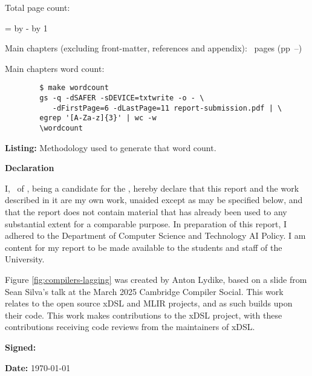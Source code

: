 \begin{sffamily}
Total page count: \pageref{LastPage}

\makeatletter
\@tempcnta=\relax%
\advance\@tempcnta by -%
\advance\@tempcnta by 1%
\xdef\contentpages{\the\@tempcnta}%
\makeatother

Main chapters (excluding front-matter, references and appendix):
\contentpages~pages
(pp~\pageref{firstcontentpage}--\pageref{lastcontentpage})

Main chapters word count: \wordcount

\vspace*{2em}
\begin{code}
    \begin{verbatim}
        $ make wordcount
        gs -q -dSAFER -sDEVICE=txtwrite -o - \
           -dFirstPage=6 -dLastPage=11 report-submission.pdf | \
        egrep '[A-Za-z]{3}' | wc -w
        \wordcount
    \end{verbatim}
    \captionsetup{textfont=sf}
    \caption*{\textbf{Listing:} Methodology used to generate that word count.}
\end{code}



\vspace{\fill}
\onehalfspacing
\makeatletter
\textbf{\Huge Declaration}
\vspace{40pt}

I, \@author\ of \college, being a candidate for the \course, hereby declare that
this report and the work described in it are my own work, unaided except as may
be specified below, and that the report does not contain material that has
already been used to any substantial extent for a comparable purpose. In
preparation of this report, I adhered to the Department of Computer Science and
Technology AI Policy. I am content for my report to be made available to the
students and staff of the University.

Figure \ref{fig:compilers-lagging} was created by Anton Lydike, based on a slide from Sean Silva's talk at the March 2025 Cambridge Compiler Social. This work relates to the open source xDSL and MLIR projects, and as such builds upon their code. This work makes contributions to the xDSL project, with these contributions receiving code reviews from the maintainers of xDSL.

\bigskip
\textbf{Signed:} \@author

\bigskip
\textbf{Date:} \today
\vspace{\fill}

\makeatother

\end{sffamily}
\onehalfspacing

\fi
